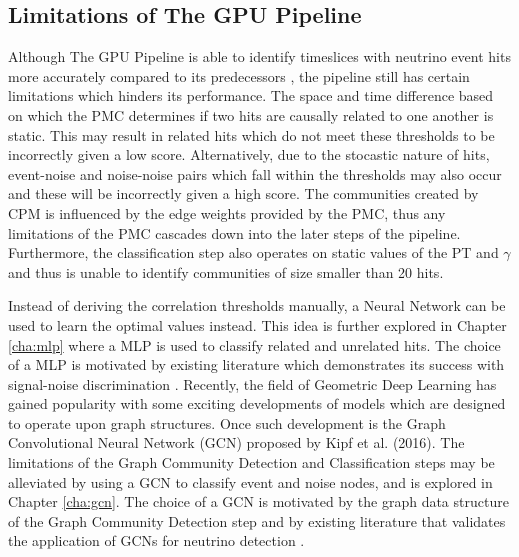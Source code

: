 \subsection{Limitations of The GPU Pipeline}
Although The GPU Pipeline is able to identify timeslices with neutrino
event hits more accurately compared to its predecessors
\cite{karas2019data}, the pipeline still has certain limitations which
hinders its performance. The space and time difference based on which
the PMC determines if two hits are causally related to one another is
static. This may result in related hits which do not meet these
thresholds to be incorrectly given a low score. Alternatively, due to
the stocastic nature of hits, event-noise and noise-noise pairs which
fall within the thresholds may also occur and these will be
incorrectly given a high score. The communities created by CPM is
influenced by the edge weights provided by the PMC, thus any
limitations of the PMC cascades down into the later steps of the
pipeline. Furthermore, the classification step also operates on static
values of the PT and $\gamma$ and thus is unable to identify
communities of size smaller than 20 hits.

Instead of deriving the correlation thresholds manually, a Neural
Network can be used to learn the optimal values instead. This idea is
further explored in Chapter \ref{cha:mlp} where a MLP is used to
classify related and unrelated hits. The choice of a MLP is motivated
by existing literature which demonstrates its success with
signal-noise discrimination \cite{psihas2020review,
  mulmule2020machine}. Recently, the field of Geometric Deep Learning
has gained popularity with some exciting developments of models which
are designed to operate upon graph structures. Once such development
is the Graph Convolutional Neural Network (GCN) proposed by Kipf et
al. (2016). The limitations of the Graph Community Detection and
Classification steps may be alleviated by using a GCN to classify
event and noise nodes, and is explored in Chapter \ref{cha:gcn}. The
choice of a GCN is motivated by the graph data structure of the Graph
Community Detection step and by existing literature that validates the
application of GCNs for neutrino detection \cite{choma2018graph}.
